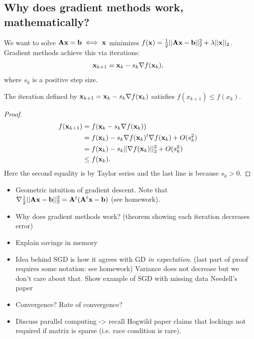 \documentclass[./some_latex_template.tex]{subfiles}
\begin{document}
\subsection{Why does gradient methods work, mathematically?}

We want to solve $\mathbf{A}\mathbf{x} = \mathbf{b} \iff \mathbf{x}$ minimizes $f(\mathbf{x}) = \frac{1}{2}||\mathbf{A}\mathbf{x} - \mathbf{b}||^2_2 + \lambda||\mathbf{x}||_2$. Gradient methods achieve this via iterations:
\begin{align}\label{gradient_method_works}
	\mathbf{x}_{k + 1} = \mathbf{x}_k - s_k \nabla f(\mathbf{x}_k),
\end{align}
where $s_k$ is a positive step size. 

\begin{theorem}
	The iteration defined by $\mathbf{x}_{k + 1} = \mathbf{x}_k - s_k \nabla f(\mathbf{x}_k)$ satisfies $f(x_{k + 1}) \le f(x_k)$. 
\end{theorem}
\begin{proof}
	\begin{align*}
		f(\mathbf{x}_{k + 1}) 
		&= f(\mathbf{x}_k - s_k\nabla f(\mathbf{x}_k)) \\
		&= f(\mathbf{x}_k) - s_k\nabla f(\mathbf{x}_k)^t\nabla f(\mathbf{x}_k) + O(s_k^2)\\
		&= f(\mathbf{x}_k) - s_k ||\nabla f(\mathbf{x}_k)||_2^2 + O(s_k^2)\\
		&\le f(\mathbf{x}_k).
	\end{align*}
Here the second equality is by Taylor series and the last line is because $s_k > 0$. 
\end{proof}

\begin{itemize}
	\item Geometric intuition of gradient descent. Note that $\nabla \frac{1}{2}||\mathbf{A}\mathbf{x} - \mathbf{b}||_2^2 = \mathbf{A}^t(\mathbf{A}^t\mathbf{x} - \mathbf{b})$ (see homework).
	\item Why does gradient methods work? (theorem showing each iteration decreases error)
	\item Explain savings in memory
	\item Idea behind SGD is how it agrees with GD \textit{in expectation}. (last part of proof requires some notation: see homework) Variance does not decrease but we don't care about that. Show example of SGD with missing data Needell's paper
	\item Convergence? Rate of convergence?
	\item Discuss parallel computing -> recall Hogwild paper claims that lockings not required if matrix is sparse (i.e. race condition is rare). 
\end{itemize}
\end{document}

